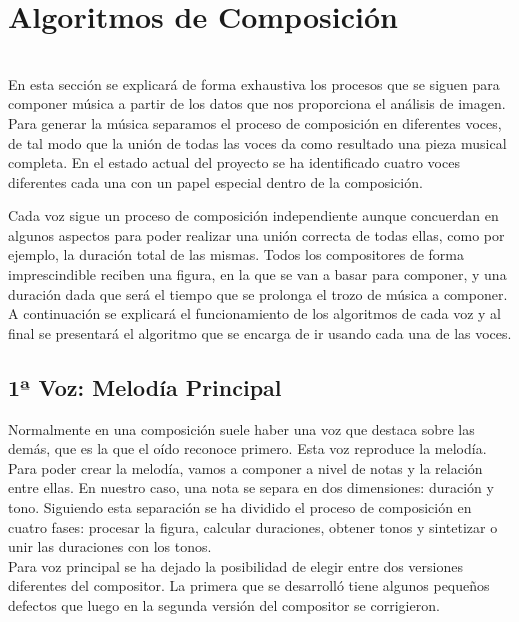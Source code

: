 \section{Algoritmos de Composición}
\label{sec:algComposicion}

\\

En esta sección se explicará de forma exhaustiva los procesos que se siguen para componer música a partir de los datos que nos proporciona el análisis de imagen.\\

Para generar la música separamos el proceso de composición en diferentes voces, de tal modo que la unión de todas las voces da como resultado una pieza musical completa. En el estado actual del proyecto se ha identificado cuatro voces diferentes cada una con un papel especial dentro de la composición. 

Cada voz sigue un proceso de composición independiente aunque concuerdan en algunos aspectos para poder realizar una unión correcta de todas ellas, como por ejemplo, la duración total de las mismas. Todos los compositores de forma imprescindible reciben una figura, en la que se van a basar para componer, y una duración dada que será el tiempo que se prolonga el trozo de música a componer.\\

A continuación se explicará el funcionamiento de los algoritmos de cada voz y al final se presentará el algoritmo que se encarga de ir usando cada una de las voces.

\subsection{1ª Voz: Melodía Principal}

Normalmente en una composición suele haber una voz que destaca sobre las demás, que es la que el oído reconoce primero. Esta voz reproduce la melodía. Para poder crear la melodía, vamos a componer a nivel de notas y la relación entre ellas. En nuestro caso, una nota se separa en dos dimensiones: duración y tono. Siguiendo esta separación se ha dividido el proceso de composición en cuatro fases: procesar la figura, calcular duraciones, obtener tonos y sintetizar o unir las duraciones con los tonos.\\
Para voz principal se ha dejado la posibilidad de elegir entre dos versiones diferentes del compositor. La primera que se desarrolló tiene algunos pequeños defectos que luego en la segunda versión del compositor se corrigieron.\\

